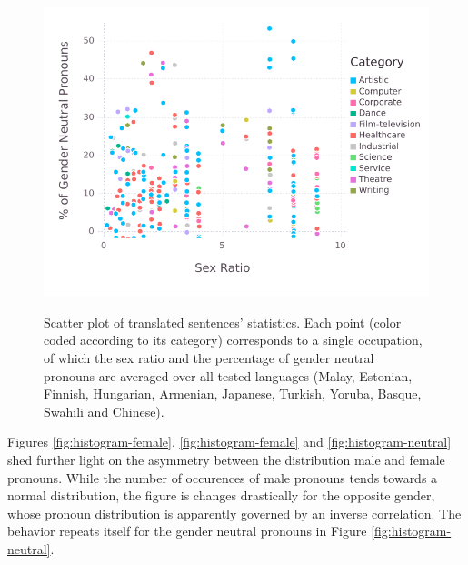 \documentclass{article}
\begin{document}
\begin{figure}[H]
	\centering
	\includegraphics[width=\linewidth]{pictures/scatterplot-languages}
	\label{fig:scatterplot-languages}
	\caption{Scatter plot of translated sentences' statistics. Each point (color coded according to its category) corresponds to a single occupation, of which the sex ratio and the percentage of gender neutral pronouns are averaged over all tested languages (Malay, Estonian, Finnish, Hungarian, Armenian, Japanese, Turkish, Yoruba, Basque, Swahili and Chinese).}
\end{figure}

Figures \ref{fig:histogram-female}, \ref{fig:histogram-female} and \ref{fig:histogram-neutral} shed further light on the asymmetry between the distribution male and female pronouns. While the number of occurences of male pronouns tends towards a normal distribution, the figure is changes drastically for the opposite gender, whose pronoun distribution is apparently governed by an inverse correlation. The behavior repeats itself for the gender neutral pronouns in Figure \ref{fig:histogram-neutral}.
\end{document}
